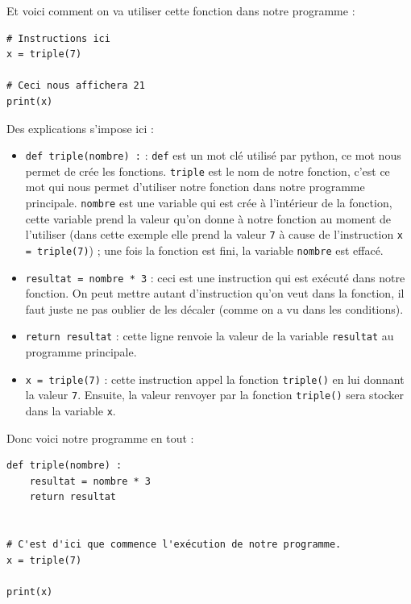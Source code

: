 \documentclass[12pt]{article}
\newcommand{\code}[1]{\colorbox{light-gray}{\texttt{#1}}}
\begin{document}
            Et voici comment on va utiliser cette fonction dans notre programme :
            \begin{lstlisting}[style=code]
# Instructions ici  
x = triple(7)

# Ceci nous affichera 21
print(x)
            \end{lstlisting}

            Des explications s'impose ici :
            \begin{itemize}
                \item \code{def triple(nombre) :} : \code{def} est un mot clé utilisé par python, ce mot nous
                    permet de crée les fonctions. \code{triple} est le nom de notre fonction, c'est ce 
                    mot qui nous permet d'utiliser notre fonction dans notre programme principale. \code{nombre}
                    est une variable qui est crée à l'intérieur de la fonction, cette variable prend la valeur qu'on
                    donne à notre fonction au moment de l'utiliser (dans cette exemple elle prend la valeur \code{7} 
                    à cause de l'instruction \code{x = triple(7)}) ; une fois la fonction est fini, la variable 
                    \code{nombre} est effacé.

                \item \code{resultat = nombre * 3} : ceci est une instruction qui est exécuté dans notre fonction. 
                    On peut mettre autant d'instruction qu'on veut dans la fonction, il faut juste ne pas oublier de
                    les décaler (comme on a vu dans les conditions).
                \item \code{return resultat} : cette ligne renvoie la valeur de la variable \code{resultat} au 
                    programme principale.
                \item \code{x = triple(7)} : cette instruction appel la fonction \code{triple()} en lui donnant la 
                    valeur \code{7}. Ensuite, la valeur renvoyer par la fonction \code{triple()} sera stocker dans
                    la variable \code{x}.
            \end{itemize}

            Donc voici notre programme en tout :
            \begin{lstlisting}[style=code]
def triple(nombre) :
    resultat = nombre * 3
    return resultat


# C'est d'ici que commence l'exécution de notre programme.
x = triple(7)

print(x)
            \end{lstlisting}
\end{document}
